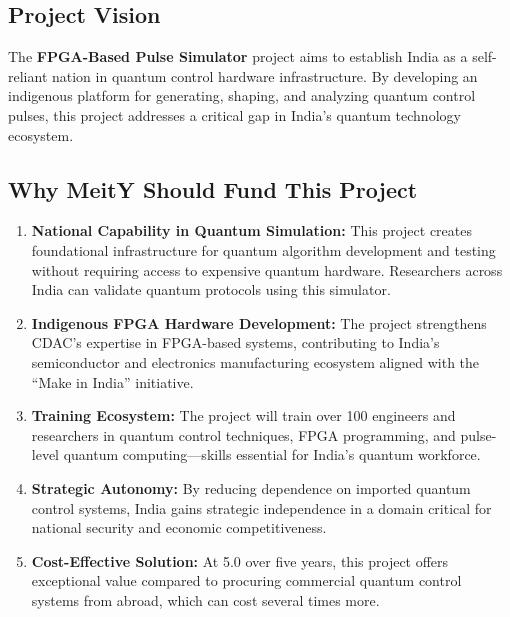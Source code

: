 \documentclass[12pt,a4paper]{article}
\newcommand{\rupees}[1]{\text{₹}#1}
\newcommand{\crore}[1]{\rupees{#1}\text{ crores}}
\theoremstyle{definition}
\begin{document}
\subsection{Project Vision}

The \textbf{FPGA-Based Pulse Simulator} project aims to establish India as a self-reliant nation in quantum control hardware infrastructure. By developing an indigenous platform for generating, shaping, and analyzing quantum control pulses, this project addresses a critical gap in India's quantum technology ecosystem.

\subsection{Why MeitY Should Fund This Project}

\begin{enumerate}[label=\textbf{\arabic*.}, leftmargin=2cm]
    \item \textbf{National Capability in Quantum Simulation:} This project creates foundational infrastructure for quantum algorithm development and testing without requiring access to expensive quantum hardware. Researchers across India can validate quantum protocols using this simulator.
    
    \item \textbf{Indigenous FPGA Hardware Development:} The project strengthens CDAC's expertise in FPGA-based systems, contributing to India's semiconductor and electronics manufacturing ecosystem aligned with the ``Make in India'' initiative.
    
    \item \textbf{Training Ecosystem:} The project will train over 100 engineers and researchers in quantum control techniques, FPGA programming, and pulse-level quantum computing---skills essential for India's quantum workforce.
    
    \item \textbf{Strategic Autonomy:} By reducing dependence on imported quantum control systems, India gains strategic independence in a domain critical for national security and economic competitiveness.
    
    \item \textbf{Cost-Effective Solution:} At \crore{5.0} over five years, this project offers exceptional value compared to procuring commercial quantum control systems from abroad, which can cost several times more.
\end{enumerate}
\end{document}
